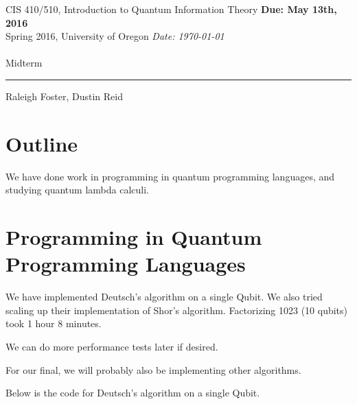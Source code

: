 \documentclass{article}
\newcommand{\shortbar}{\begin{center}\rule{5ex}{0.1pt}\end{center}}
\newcommand{\courseNumber}{CIS 410/510}
\newcommand{\courseTitle}{Introduction to Quantum Information Theory}
\newcommand{\semester}{Spring 2016}
\theoremstyle{plain}
\theoremstyle{definition}
\theoremstyle{remark}
\newenvironment{solution}[1]{\medskip\noindent{\bf Solution #1.~}}{\shortbar}
\newcommand{\solutions}[3]{
\vspace{-2ex}
\begin{center}
{\small  \courseNumber, \courseTitle
\hfill {\large \bf {Due: #1} }\\
\semester, University of Oregon \hfill
{\em Date: #3}}\\
\vspace{-1ex}
\hrulefill\\
\vspace{4ex}
{\Large #2}\\
\vspace{2ex}
\end{center}
\shortbar
\vspace{3ex}
}
\begin{document}
\solutions{May 13th, 2016}{Midterm}{\today}
%
%


$$$$Raleigh Foster, Dustin Reid$$$$

\section{Outline}

We have done work in programming in quantum programming languages,
and studying quantum lambda calculi.



\section{Programming in Quantum Programming Languages}

We have implemented Deutsch's algorithm on a single Qubit.
We also tried scaling up their implementation of Shor's algorithm.
Factorizing 1023 (10 qubits) took 1 hour 8 minutes.

We can do more performance tests later if desired.

For our final, we will probably also be implementing other algorithms.

Below is the code for Deutsch's algorithm on a single Qubit.
\end{document}
